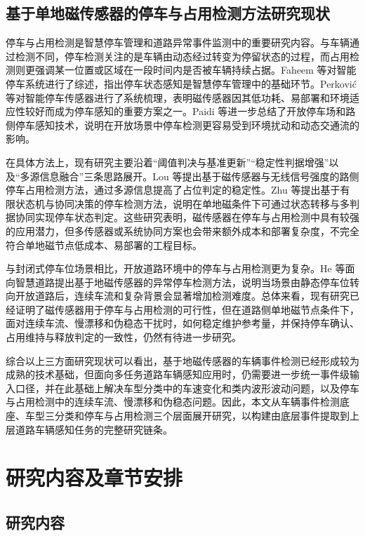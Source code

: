 \documentclass{xdupgthesis}
\begin{document}
\subsection{基于单地磁传感器的停车与占用检测方法研究现状}
\label{sec:related_parking_detection}

停车与占用检测是智慧停车管理和道路异常事件监测中的重要研究内容。与车辆通过检测不同，停车检测关注的是车辆由动态经过转变为停留状态的过程，而占用检测则更强调某一位置或区域在一段时间内是否被车辆持续占据。Faheem 等对智能停车系统进行了综述，指出停车状态感知是智慧停车管理中的基础环节\cite{R49}。Perković 等对智能停车传感器进行了系统梳理，表明磁传感器因其低功耗、易部署和环境适应性较好而成为停车感知的重要方案之一\cite{R44}。Paidi 等进一步总结了开放停车场和路侧停车感知技术，说明在开放场景中停车检测更容易受到环境扰动和动态交通流的影响\cite{R52}。

在具体方法上，现有研究主要沿着“阈值判决与基准更新”“稳定性判据增强”以及“多源信息融合”三条思路展开。Lou 等提出基于磁传感器与无线信号强度的路侧停车占用检测方法，通过多源信息提高了占位判定的稳定性\cite{R45}。Zhu 等提出基于有限状态机与协同决策的停车检测方法，说明在单地磁条件下可通过状态转移与多判据协同实现停车状态判定\cite{R47}。这些研究表明，磁传感器在停车与占用检测中具有较强的应用潜力，但多传感器或系统协同方案也会带来额外成本和部署复杂度，不完全符合单地磁节点低成本、易部署的工程目标。

与封闭式停车位场景相比，开放道路环境中的停车与占用检测更为复杂。He 等面向智慧道路提出基于地磁传感器的异常停车检测方法，说明当场景由静态停车位转向开放道路后，连续车流和复杂背景会显著增加检测难度\cite{R43}。总体来看，现有研究已经证明了磁传感器用于停车与占用检测的可行性，但在道路侧单地磁节点条件下，面对连续车流、慢漂移和伪稳态干扰时，如何稳定维护参考量，并保持停车确认、占用维持与释放判定的一致性，仍然有待进一步研究。

综合以上三方面研究现状可以看出，基于地磁传感器的车辆事件检测已经形成较为成熟的技术基础，但面向多任务道路车辆感知应用时，仍需要进一步统一事件级输入口径，并在此基础上解决车型分类中的车速变化和类内波形波动问题，以及停车与占用检测中的连续车流、慢漂移和伪稳态问题。因此，本文从车辆事件检测底座、车型三分类和停车与占用检测三个层面展开研究，以构建由底层事件提取到上层道路车辆感知任务的完整研究链条。


\section{研究内容及章节安排}
\label{sec:intro_content}

\subsection{研究内容}
\label{sec:research_content}
\end{document}
